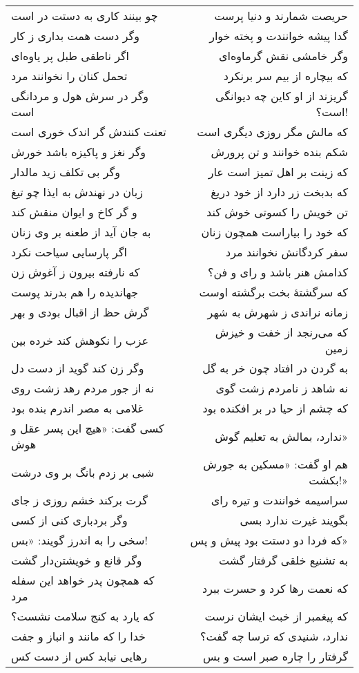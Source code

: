 \begin{center}
\begin{longtable}{l p{0.5cm} r}
\\
چو بینند کاری به دستت در است
&&
حریصت شمارند و دنیا پرست
\\
وگر دست همت بداری ز کار
&&
گدا پیشه خوانندت و پخته خوار
\\
اگر ناطقی طبل پر یاوه‌ای
&&
وگر خامشی نقش گرماوه‌ای
\\
تحمل کنان را نخوانند مرد
&&
که بیچاره از بیم سر برنکرد
\\
وگر در سرش هول و مردانگی است
&&
گریزند از او کاین چه دیوانگی است؟!
\\
تعنت کنندش گر اندک خوری است
&&
که مالش مگر روزی دیگری است
\\
وگر نغز و پاکیزه باشد خورش
&&
شکم بنده خوانند و تن پرورش
\\
وگر بی تکلف زید مالدار
&&
که زینت بر اهل تمیز است عار
\\
زبان در نهندش به ایذا چو تیغ
&&
که بدبخت زر دارد از خود دریغ
\\
و گر کاخ و ایوان منقش کند
&&
تن خویش را کسوتی خوش کند
\\
به جان آید از طعنه بر وی زنان
&&
که خود را بیاراست همچون زنان
\\
اگر پارسایی سیاحت نکرد
&&
سفر کردگانش نخوانند مرد
\\
که نارفته بیرون ز آغوش زن
&&
کدامش هنر باشد و رای و فن؟
\\
جهاندیده را هم بدرند پوست
&&
که سرگشتهٔ بخت برگشته اوست
\\
گرش حظ از اقبال بودی و بهر
&&
زمانه نراندی ز شهرش به شهر
\\
عزب را نکوهش کند خرده بین
&&
که می‌رنجد از خفت و خیزش زمین
\\
وگر زن کند گوید از دست دل
&&
به گردن در افتاد چون خر به گل
\\
نه از جور مردم رهد زشت روی
&&
نه شاهد ز نامردم زشت گوی
\\
غلامی به مصر اندرم بنده بود
&&
که چشم از حیا در بر افکنده بود
\\
کسی گفت: «هیچ این پسر عقل و هوش
&&
ندارد، بمالش به تعلیم گوش»
\\
شبی بر زدم بانگ بر وی درشت
&&
هم او گفت: «مسکین به جورش بکشت!»
\\
گرت برکند خشم روزی ز جای
&&
سراسیمه خوانندت و تیره رای
\\
وگر بردباری کنی از کسی
&&
بگویند غیرت ندارد بسی
\\
سخی را به اندرز گویند: «بس!
&&
که فردا دو دستت بود پیش و پس»
\\
وگر قانع و خویشتن‌دار گشت
&&
به تشنیع خلقی گرفتار گشت
\\
که همچون پدر خواهد این سفله مرد
&&
که نعمت رها کرد و حسرت ببرد
\\
که یارد به کنج سلامت نشست؟
&&
که پیغمبر از خبث ایشان نرست
\\
خدا را که مانند و انباز و جفت
&&
ندارد، شنیدی که ترسا چه گفت؟
\\
رهایی نیابد کس از دست کس
&&
گرفتار را چاره صبر است و بس
\\
\end{longtable}
\end{center}
